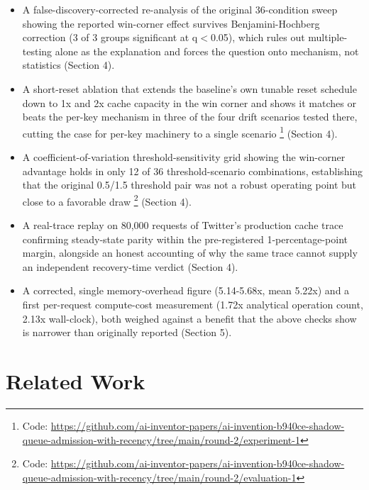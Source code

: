 \documentclass[11pt,letterpaper]{article}
\begin{document}
\begin{itemize}
\item A false-discovery-corrected re-analysis of the original 36-condition sweep showing the reported win-corner effect survives Benjamini-Hochberg correction (3 of 3 groups significant at q$<$0.05), which rules out multiple-testing alone as the explanation and forces the question onto mechanism, not statistics (Section 4).
\item A short-reset ablation that extends the baseline's own tunable reset schedule down to 1x and 2x cache capacity in the win corner and shows it matches or beats the per-key mechanism in three of the four drift scenarios tested there, cutting the case for per-key machinery to a single scenario \footnote{Code: \url{https://github.com/ai-inventor-papers/ai-invention-b940ce-shadow-queue-admission-with-recency/tree/main/round-2/experiment-1}} (Section 4).
\item A coefficient-of-variation threshold-sensitivity grid showing the win-corner advantage holds in only 12 of 36 threshold-scenario combinations, establishing that the original 0.5/1.5 threshold pair was not a robust operating point but close to a favorable draw \footnote{Code: \url{https://github.com/ai-inventor-papers/ai-invention-b940ce-shadow-queue-admission-with-recency/tree/main/round-2/evaluation-1}} (Section 4).
\item A real-trace replay on 80,000 requests of Twitter's production cache trace confirming steady-state parity within the pre-registered 1-percentage-point margin, alongside an honest accounting of why the same trace cannot supply an independent recovery-time verdict (Section 4).
\item A corrected, single memory-overhead figure (5.14-5.68x, mean 5.22x) and a first per-request compute-cost measurement (1.72x analytical operation count, 2.13x wall-clock), both weighed against a benefit that the above checks show is narrower than originally reported (Section 5).
\end{itemize}

\section{Related Work}
\end{document}
